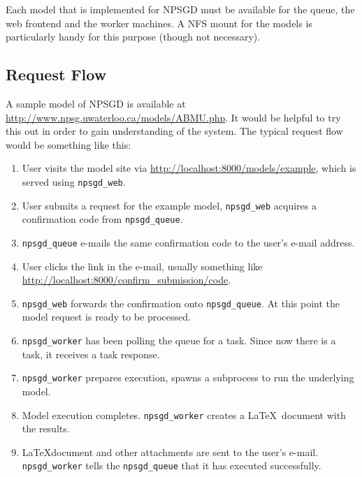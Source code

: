 \documentclass{article}
\begin{document}
Each model that is implemented for NPSGD must be available for the queue, the
web frontend and the worker machines. A NFS mount for the models is particularly
handy for this purpose (though not necessary).

\subsection{Request Flow}
A sample model of NPSGD is available at
\url{http://www.npsg.uwaterloo.ca/models/ABMU.php}. It would be helpful to try
this out in order to gain understanding of the system. The typical request flow
would be something like this:
\begin{enumerate}
    \item User visits the model site via \url{http://localhost:8000/models/example},
    which is served using \texttt{npsgd\_web}.

    \item User submits a request for the example model, \texttt{npsgd\_web}
    acquires a confirmation code from \texttt{npsgd\_queue}.

    \item \texttt{npsgd\_queue} e-mails the same confirmation code to the user's e-mail
    address.
    
    \item User clicks the link in the e-mail, usually something like
    \url{http://localhost:8000/confirm\_submission/code}. 

    \item \texttt{npsgd\_web} forwards the confirmation onto
    \texttt{npsgd\_queue}. At this point the model request is ready to be
    processed.

    \item \texttt{npsgd\_worker} has been polling the queue for a task. Since
    now there is a task, it receives a task response.

    \item \texttt{npsgd\_worker} prepares execution, spawns a subprocess to run
    the underlying model.
    
    \item Model execution completes. \texttt{npsgd\_worker} creates a \LaTeX\ 
    document with the results.

    \item \LaTeX document and other attachments are sent to the user's e-mail.
    \texttt{npsgd\_worker} tells the \texttt{npsgd\_queue} that it has executed successfully.
\end{enumerate}
\end{document}
